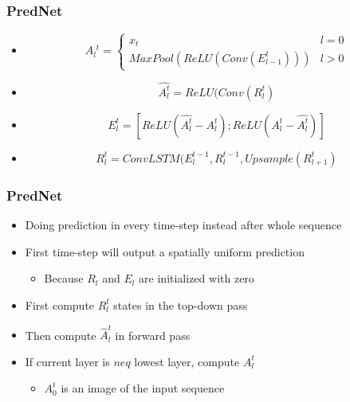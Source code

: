   \begin{frame}
   \frametitle{PredNet}
   
   \begin{itemize}
    \item<1->{
     \begin{equation}
      A{_l}^t = \begin{cases} x_t & l = 0 \\ MaxPool(ReLU(Conv(E_{l-1}^t))) & l > 0 \end{cases}
     \end{equation}
    }
    \item<2->{
     \begin{equation}
      \hat{A_l^t} = ReLU(Conv(R_l^t)
     \end{equation}
    }
    \item<3->{
     \begin{equation}
      E_l^t = [ReLU(\hat{A_l^t} - A_l^t); ReLU(A_l^t - \hat{A_l^t})]
     \end{equation}
    }
    \item<4->{
     \begin{equation}
      R_l^t = ConvLSTM(E_l^{t-1}, R_l^{t-1}, Upsample(R_{l+1}^t)
     \end{equation}
    }
   \end{itemize}
   
  \end{frame}
  \begin{frame}
   \frametitle{PredNet}
   
   \begin{itemize}
    \item<1-> Doing prediction in every time-step instead after whole sequence
    \item<2-> First time-step will output a spatially uniform prediction
    \begin{itemize}
     \item<3-> Because $R_l$ and $E_l$ are initialized with zero
    \end{itemize}
    \item<4-> First compute $R_l^t$ states in the top-down pass
    \item<5-> Then compute $\hat{A}_l^t$ in forward pass
    \item<6-> If current layer is $neq$ lowest layer, compute $A_l^t$
    \begin{itemize}
     \item<7-> $A_0^t$ is an image of the input sequence
    \end{itemize}
   \end{itemize}
   
  \end{frame}
